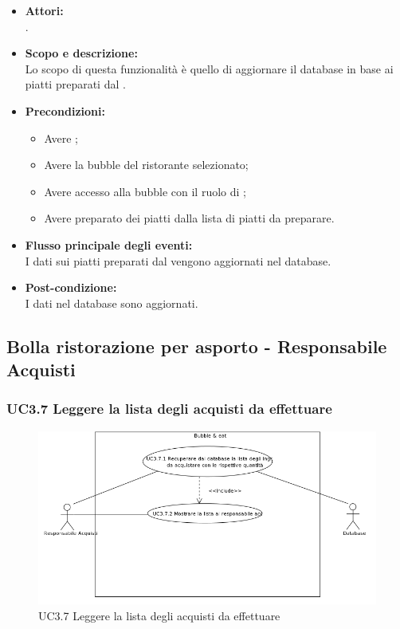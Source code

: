 \begin{itemize}
	\item \textbf{Attori:}
	\\.
	\item \textbf{Scopo e descrizione:} 
	\\Lo scopo di questa funzionalità è quello di aggiornare il database in base ai piatti preparati dal .
	\item \textbf{Precondizioni:}
	\begin{itemize}
		\item Avere ;
		\item Avere la bubble del ristorante selezionato;
		\item Avere accesso alla bubble con il ruolo di ;
		\item Avere preparato dei piatti dalla lista di piatti da preparare.
	\end{itemize}
	\item \textbf{Flusso principale degli eventi:}
	\\I dati sui piatti preparati dal  vengono aggiornati nel database.
	\item \textbf{Post-condizione:}
	\\I dati nel database sono aggiornati.
\end{itemize}

\subsection{Bolla ristorazione per asporto - Responsabile Acquisti}

\subsubsection{UC3.7 Leggere la lista degli acquisti da effettuare} \label{UC3.7}

\begin{figure}[H]
	\centering
	\includegraphics[width=15cm]{../../documenti/AnalisiDeiRequisiti/Diagrammi_img/uc3_7.png}
	\caption{UC3.7 Leggere la lista degli acquisti da effettuare}
\end{figure}

